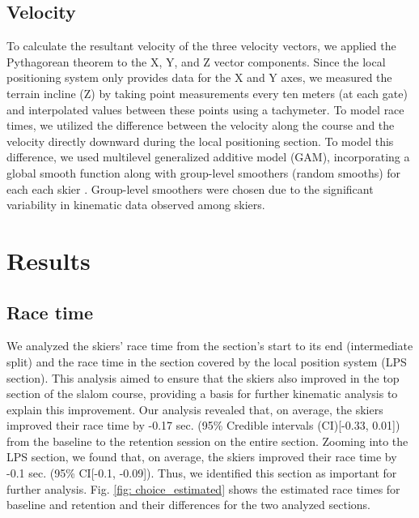 \documentclass{article}
\begin{document}
\subsection{Velocity}
To calculate the resultant velocity of the three velocity vectors, we applied the Pythagorean theorem to the X, Y, and Z vector components. Since the local positioning system only provides data for the X and Y axes, we measured the terrain incline (Z) by taking point measurements every ten meters (at each gate) and interpolated values between these points using a tachymeter. To model race times, we utilized the difference between the velocity along the course and the velocity directly downward during the local positioning section. To model this difference, we used multilevel generalized additive model (GAM), incorporating a global smooth function along with group-level smoothers (random smooths) for each each skier \cite{pedersen_hierarchical_2019}. Group-level smoothers were chosen due to the significant variability in kinematic data observed among skiers.

 

\section{Results}



\subsection{Race time}
We analyzed the skiers' race time from the section's start to its end (intermediate split) and the race time in the section covered by the local position system (LPS section). This analysis aimed to ensure that the skiers also improved in the top section of the slalom course, providing a basis for further kinematic analysis to explain this improvement. Our analysis revealed that, on average, the skiers improved their race time by -0.17 sec. (95\% Credible intervals (CI)[-0.33, 0.01]) from the baseline to the retention session on the entire section. Zooming into the LPS section, we found that, on average, the skiers improved their race time by -0.1 sec. (95\% CI[-0.1, -0.09]). Thus, we identified this section as important for further analysis. Fig. \ref{fig: choice_estimated} shows the estimated race times for baseline and retention and their differences for the two analyzed sections. 
\end{document}
